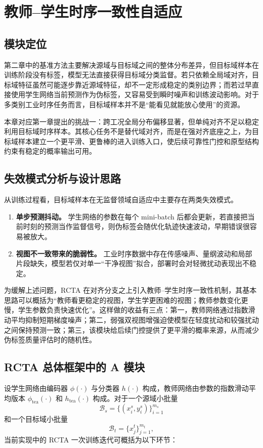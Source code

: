 \chapter{教师--学生时序一致性自适应}

\section{模块定位}
第二章中的基准方法主要解决源域与目标域之间的整体分布差异，但目标域样本在训练阶段没有标签，模型无法直接获得目标域分类监督。若只依赖全局域对齐，目标域特征虽然可能逐步靠近源域特征，却不一定形成稳定的类别边界；而若过早直接使用学生网络当前预测作为伪标签，又容易受到瞬时噪声和训练波动影响。对于多类别工业时序任务而言，目标域样本并不是“能看见就能放心使用”的资源。

本章对应第一章提出的挑战一：跨工况全局分布偏移显著，但单纯对齐不足以稳定利用目标域时序样本。其核心任务不是替代域对齐，而是在强对齐底座之上，为目标域样本建立一个更平滑、更鲁棒的进入训练入口，使后续可靠性门控和原型结构约束有稳定的概率输出可用。

\section{失效模式分析与设计思路}
从训练过程看，目标域样本在无监督领域自适应中主要存在两类失效模式。

\begin{enumerate}
\item \textbf{单步预测抖动。} 学生网络的参数在每个 mini-batch 后都会更新，若直接把当前时刻的预测当作监督信号，则伪标签会随优化轨迹快速波动，早期错误很容易被放大。
\item \textbf{视图不一致带来的脆弱性。} 工业时序数据中存在传感噪声、量纲波动和局部片段缺失，模型若仅对单一“干净视图”拟合，部署时会对轻微扰动表现出不稳定。
\end{enumerate}

为缓解上述问题，RCTA 在对齐分支之上引入教师--学生时序一致性机制，其基本思路可以概括为“教师看更稳定的视图，学生学更困难的视图；教师参数变化更慢，学生参数负责快速优化”。这样做的收益有三点：第一，教师网络通过指数滑动平均抑制短期梯度噪声；第二，弱强双视图增强迫使模型在轻度扰动和较强扰动之间保持预测一致；第三，该模块给后续门控提供了更平滑的概率来源，从而减少伪标签质量评估时的随机性。

\section{RCTA 总体框架中的 A 模块}
设学生网络由编码器 $\phi(\cdot)$ 与分类器 $h(\cdot)$ 构成，教师网络由参数的指数滑动平均版本 $\phi_{\mathrm{tea}}(\cdot)$ 和 $h_{\mathrm{tea}}(\cdot)$ 构成。对于一个源域小批量
\begin{equation}
\mathcal{B}_s=\{(x_i^s,y_i^s)\}_{i=1}^{m_s}
\end{equation}
和一个目标域小批量
\begin{equation}
\mathcal{B}_t=\{x_j^t\}_{j=1}^{m_t},
\end{equation}
当前实现中的 RCTA 一次训练迭代可概括为以下环节：

